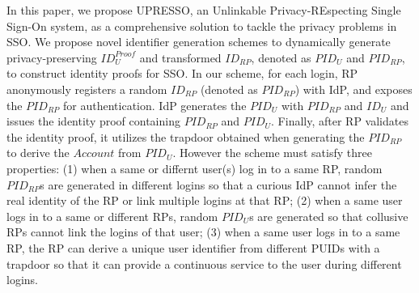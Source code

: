 In this paper, we propose UPRESSO, an Unlinkable Privacy-REspecting Single Sign-On system, as a comprehensive solution to tackle the privacy problems in SSO. We propose novel identifier generation schemes to dynamically generate  privacy-preserving $ID_U^{Proof}$ and transformed $ID_{RP}$, denoted as $PID_U$ and $PID_{RP}$, to construct identity proofs for SSO. In our scheme, for each login, RP anonymously registers a random $ID_{RP}$ (denoted as $PID_{RP}$) with IdP, and exposes the $PID_{RP}$ for authentication. IdP generates the $PID_U$ with $PID_{RP}$ and $ID_U$ and issues the identity proof containing $PID_{RP}$ and $PID_U$. Finally, after RP validates the identity proof, it utilizes the trapdoor obtained when generating the $PID_{RP}$ to derive the $Account$ from $PID_U$. However the scheme must satisfy three properties: (1) when a same or differnt user(s) log in to a same RP, random $PID_{RP}$s are generated in different logins so that a curious IdP cannot infer the real identity of the RP or link multiple logins at that RP; (2) when a same user logs in to a same or different RPs, random $PID_U$s are generated so that collusive RPs cannot link the logins of that user; (3) when a same user logs in to a same RP, the RP can derive a unique user identifier from different PUIDs with a trapdoor so that it can provide a continuous service to the user during different logins.





